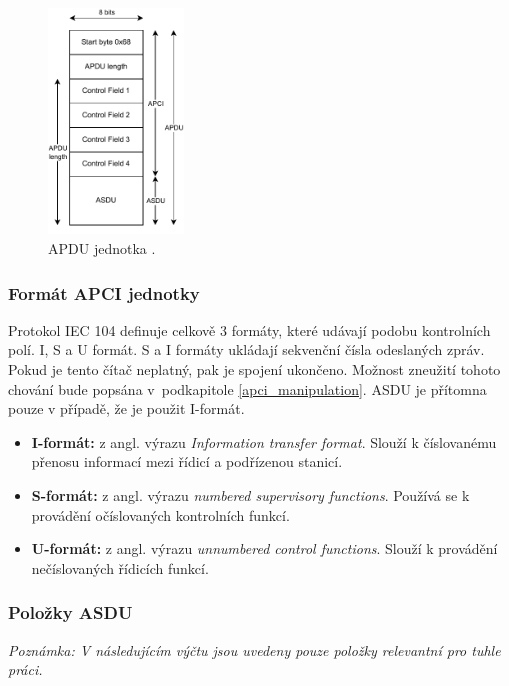 \begin{figure}[H]
	\centering
	\includegraphics[width=0.32\textwidth]{obrazky-figures/iec104_diagram.pdf}
	\caption{APDU jednotka \cite{iec_104}.}
	\label{apdu_img}
\end{figure}


\subsubsection*{Formát APCI jednotky}
\label{apci_unit}

Protokol IEC 104 definuje celkově 3 formáty, které udávají podobu kontrolních polí. I, S a U formát.
S a I formáty ukládají sekvenční čísla odeslaných zpráv. Pokud je tento čítač neplatný, pak je spojení ukončeno. Možnost zneužití tohoto chování bude popsána v~podkapitole \ref{apci_manipulation}. ASDU je přítomna pouze v případě, že je použit I-formát.

\begin{itemize}
    \item \textbf{I-formát:} z angl. výrazu \emph{Information transfer format}. Slouží k číslovanému přenosu informací mezi řídicí a podřízenou stanicí.
    \item \textbf{S-formát:} z angl. výrazu \emph{numbered supervisory functions}. Používá se k provádění očíslovaných kontrolních funkcí.
    \item \textbf{U-formát:} z angl. výrazu \emph{unnumbered control functions}. Slouží k provádění nečíslovaných řídicích funkcí.
\end{itemize}


\subsubsection*{Položky ASDU}
\label{polozky_asdu}

\emph{Poznámka: V následujícím výčtu jsou uvedeny pouze položky relevantní pro tuhle práci.}


